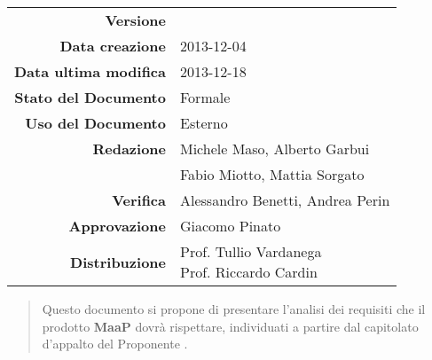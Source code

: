 

\newcommand{\Versione}{\versioneAnalisiDeiRequisiti{}}	%
\newcommand{\Data}{2013-12-04}							%
\newcommand{\DataUltimaModifica}{2013-12-18}
\newcommand{\TipoDocumento}{Analisi dei Requisiti}		%






\begin{center}
\begin{tabular}{r|l}
\textbf{Versione} & \Versione{} \\
\textbf{Data creazione} & \Data{} \\
\textbf{Data ultima modifica} & \DataUltimaModifica{} \\
\textbf{Stato del Documento} & Formale \\					%
\textbf{Uso del Documento} & Esterno \\						%
\textbf{Redazione} & Michele Maso, Alberto Garbui\\			%
& Fabio Miotto, Mattia Sorgato\\
\textbf{Verifica} & Alessandro Benetti, Andrea Perin\\		%
\textbf{Approvazione} & Giacomo Pinato\\					%
\textbf{Distribuzione} & \parbox[t]{4cm}{Prof. Tullio Vardanega \\ Prof. Riccardo Cardin \\ \Prop{} }\\
\end{tabular}
\end{center}

\vspace{0.05in}

\begin{abstract}
\begin{center}
Questo documento si propone di presentare l'analisi dei requisiti che il prodotto \textbf{MaaP} dovrà rispettare, individuati a partire dal capitolato d'appalto del Proponente \Prop{}.
\end{center}
\end{abstract}

